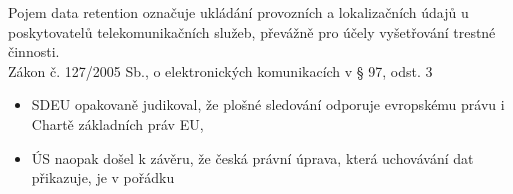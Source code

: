 Pojem data retention označuje ukládání provozních a lokalizačních údajů u poskytovatelů telekomunikačních služeb, převážně pro účely vyšetřování trestné činnosti.\\
Zákon č. 127/2005 Sb., o elektronických komunikacích v § 97, odst. 3
\begin{itemize}
    \item SDEU opakovaně judikoval, že plošné sledování odporuje evropskému právu i Chartě základních práv EU, 
    \item ÚS naopak došel k závěru, že česká právní úprava, která uchovávání dat přikazuje, je v pořádku
\end{itemize}





